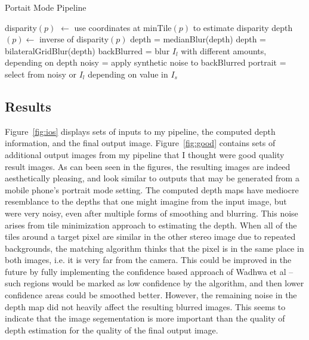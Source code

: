 \documentclass{article}
\begin{document}
\begin{algorithm}
\caption{Portait Mode Pipeline}
\label{alg:portrait}

    disparity$(p)$ $\gets$ use coordinates at minTile$(p)$ to estimate disparity \;
    depth$(p) \gets$ inverse of disparity$(p)$ \;
    depth = medianBlur(depth) \;
    depth = bilateralGridBlur(depth) \;
    backBlurred = blur $I_l$ with different amounts, depending on depth \;
    noisy = apply synthetic noise to backBlurred \;
    portrait = select from noisy or $I_l$ depending on value in $I_s$ \;
\end{algorithm}

\subsection{Results}

Figure~\ref{fig:ios} displays sets of inputs to my pipeline, the computed depth information, and the final output image.
%
Figure~\ref{fig:good} contains sets of additional output images from my pipeline that I thought were good quality result images.
%
As can been seen in the figures, the resulting images are indeed aesthetically pleasing, and look similar to outputs that may
be generated from a mobile phone's portrait mode setting.
%
The computed depth maps have mediocre resemblance to the depths that one might imagine from the input image, but were very noisy,
even after multiple forms of smoothing and blurring.
%
This noise arises from tile minimization approach to estimating the depth.
%
When all of the tiles around a target pixel are similar in the other stereo image due to repeated backgrounds, the matching
algorithm thinks that the pixel is in the same place in both images, i.e. it is very far from the camera.
%
This could be improved in the future by fully implementing the confidence based approach of Wadhwa et al -- such regions would be
marked as low confidence by the algorithm, and then lower confidence areas could be smoothed better.
%
However, the remaining noise in the depth map did not heavily affect the resulting blurred images.
%
This seems to indicate that the image segementation is more important than the quality of depth estimation for the quality
of the final output image.
\end{document}

